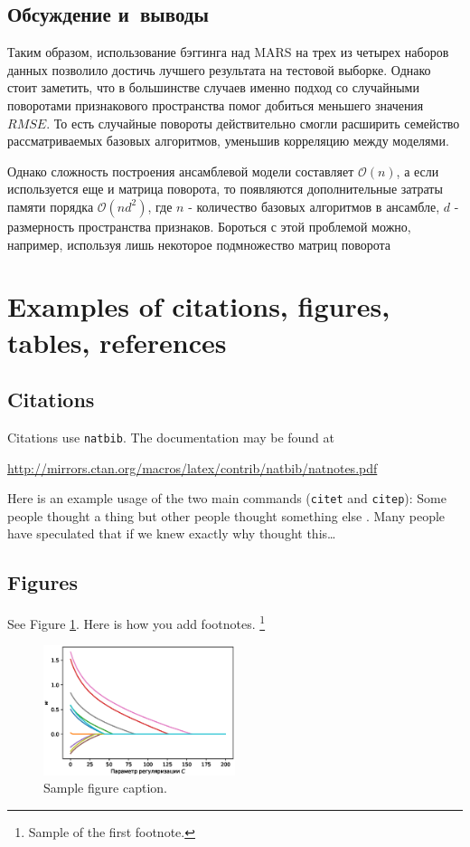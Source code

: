 \documentclass{article}
\begin{document}
\subsection{Обсуждение и~выводы}

Таким образом, использование бэггинга над MARS на трех из четырех наборов данных позволило достичь лучшего результата на тестовой выборке. Однако стоит заметить, что в большинстве случаев именно подход со случайными поворотами признакового пространства помог добиться меньшего значения $RMSE$. То есть случайные повороты действительно смогли расширить семейство рассматриваемых базовых алгоритмов, уменьшив корреляцию между моделями.

Однако сложность построения ансамблевой модели составляет $\mathcal{O}(n)$, а если используется еще и матрица поворота, то появляются дополнительные затраты памяти порядка $\mathcal{O}(nd^2)$, где $n$ - количество базовых алгоритмов в ансамбле, $d$ - размерность пространства признаков. Бороться с этой проблемой можно, например, используя лишь некоторое подмножество матриц поворота

\section{Examples of citations, figures, tables, references}
\label{sec:others}

\subsection{Citations}
Citations use \verb+natbib+. The documentation may be found at
\begin{center}
	\url{http://mirrors.ctan.org/macros/latex/contrib/natbib/natnotes.pdf}
\end{center}

Here is an example usage of the two main commands (\verb+citet+ and \verb+citep+): Some people thought a thing \citep{kour2014real, hadash2018estimate} but other people thought something else \citep{kour2014fast}. Many people have speculated that if we knew exactly why \citet{kour2014fast} thought this\dots

\subsection{Figures}
\lipsum[10]
See Figure \ref{fig:fig1}. Here is how you add footnotes. \footnote{Sample of the first footnote.}
\lipsum[11]

\begin{figure}
	\centering
	\includegraphics[width=0.5\textwidth]{../figures/log_reg_cs_exp.eps}
	\caption{Sample figure caption.}
	\label{fig:fig1}
\end{figure}
\end{document}
